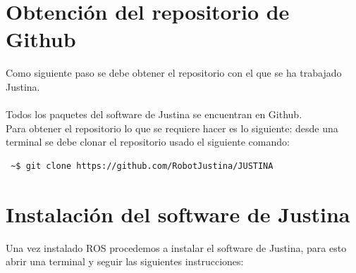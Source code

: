\documentclass[user_manual.tex]{subfiles}
\begin{document}
 \section{Obtención del repositorio de Github}
 Como siguiente paso se debe obtener el repositorio con el que se ha trabajado Justina.\\
 \\
 Todos los paquetes del software de Justina se encuentran en Github.\\
Para obtener el repositorio lo que se requiere hacer es lo siguiente: desde una terminal se debe clonar el repositorio  usado el siguiente comando:\\

\begin{verbatim}
 ~$ git clone https://github.com/RobotJustina/JUSTINA
\end{verbatim}
 
\section{Instalación del software de Justina}
Una vez instalado ROS procedemos a instalar el software de Justina, para esto abrir una terminal y seguir las siguientes instrucciones:
\end{document}

